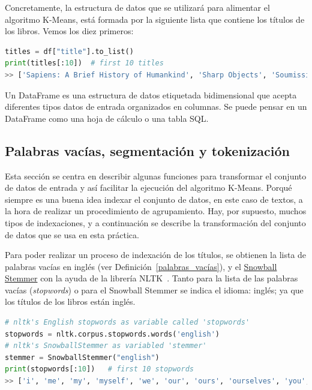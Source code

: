 \documentclass{uimppracticas}
\begin{document}
Concretamente, la estructura de datos que se utilizará para alimentar el algoritmo K-Means, está formada por la siguiente lista que contiene los títulos de los libros. Vemos los diez primeros:

\begin{lstlisting}[language=python]
titles = df["title"].to_list()
print(titles[:10])  # first 10 titles
>> ['Sapiens: A Brief History of Humankind', 'Sharp Objects', 'Soumission', 'Tipping the Velvet', 'A Light in the Attic', "It's Only the Himalayas", 'Libertarianism for Beginners', 'Mesaerion: The Best Science Fiction Stories 1800-1849', 'Olio', 'Our Band Could Be Your Life: Scenes from the American Indie Underground, 1981-1991']
\end{lstlisting}

\begin{definition}\label{dataframe}
	Un DataFrame es una estructura de datos etiquetada bidimensional que acepta diferentes tipos datos de entrada organizados en columnas. Se puede pensar en un DataFrame como una hoja de cálculo o una tabla SQL.
\end{definition}

\subsection{Palabras vacías, segmentación y tokenización}\label{stem_token}

Esta sección se centra en describir algunas funciones para transformar el conjunto de datos de entrada y así facilitar la ejecución del algoritmo K-Means. Porqué siempre es una buena idea indexar el conjunto de datos, en este caso de textos, a la hora de realizar un procedimiento de agrupamiento. Hay, por supuesto, muchos tipos de indexaciones, y a continuación se describe la transformación del conjunto de datos que se usa en esta práctica.

Para poder realizar un proceso de indexación de los títulos, se obtienen la lista de palabras vacías en inglés (ver Definición~\ref{palabras_vacías}), y el \href{https://www.nltk.org/_modules/nltk/stem/snowball.html}{Snowball Stemmer} con la ayuda de la librería NLTK~\cite{bird2009natural}. Tanto para la lista de las palabras vacías (\textit{stopwords}) o para el Snowball Stemmer se indica el idioma: inglés; ya que los títulos de los libros están inglés. 

\begin{lstlisting}[language=python]
# nltk's English stopwords as variable called 'stopwords'	
stopwords = nltk.corpus.stopwords.words('english')  
# nltk's SnowballStemmer as variabled 'stemmer'
stemmer = SnowballStemmer("english")
print(stopwords[:10])   # first 10 stopwords
>> ['i', 'me', 'my', 'myself', 'we', 'our', 'ours', 'ourselves', 'you', "you're"]    
\end{lstlisting}
\end{document}
